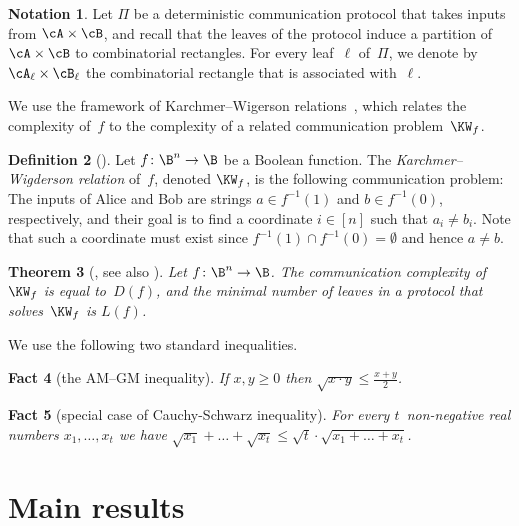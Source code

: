 \documentclass[11pt]{article}
\numberwithin{equation}{section}
\newtheorem{theorem}{Theorem}[section]
\newtheorem{fact}[theorem]{Fact}
\theoremstyle{definition}
\newtheorem{definition}[theorem]{Definition}
\theoremstyle{plain}
\theoremstyle{definition}\newtheorem{notation}[theorem]{Notation}\theoremstyle{plain}
\begin{document}
\begin{notation}
\label{notation:partition-to-rectangles}Let $\Pi$ be a deterministic communication
protocol that takes inputs from $\cA\times\cB$, and recall that the
leaves of the protocol induce a partition of $\cA\times\cB$ to combinatorial
rectangles. For every leaf~$\ell$ of~$\Pi$, we denote by $\cA_{\ell}\times\cB_{\ell}$
the combinatorial rectangle that is associated with~$\ell$. 
\end{notation}

We use the framework of Karchmer--Wigerson relations~\cite{KW90},
which relates the complexity of~$f$ to the complexity of a related
communication problem~$\KW_{f}$. 
\begin{definition}[\cite{KW90}]
Let $f\colon\B^{n}\to\B$ be a Boolean function. The \emph{Karchmer--Wigderson
relation} of~$f$, denoted $\KW_{f}$, is the following communication
problem: The inputs of Alice and Bob are strings $a\in f^{-1}(1)$
and $b\in f^{-1}(0)$, respectively, and their goal is to find a coordinate
$i\in\left[n\right]$ such that $a_{i}\ne b_{i}$. Note that such
a coordinate must exist since $f^{-1}(1)\cap f^{-1}(0)=\emptyset$
and hence $a\ne b$. 
\end{definition}

\begin{theorem}[\cite{KW90}, see also \cite{R90}]
\label{thm:KW-connection}Let $f\colon\B^{n}\to\B$. The communication
complexity of~$\KW_{f}$ is equal to~$D(f)$, and the minimal number
of leaves in a protocol that solves~$\KW_{f}$ is $L(f)$. 
\end{theorem}

%
We use the following two standard inequalities.
\begin{fact}[the AM--GM inequality]
%
%
%
%
%
If $x,y\ge 0$ then $\sqrt{x\cdot y}\le\frac{x+y}{2}$.
\end{fact}

\begin{fact}[special case of Cauchy-Schwarz inequality]
\label{fact:special-cauchy-schwarz} For every $t$~non-negative real
numbers $x_{1},\ldots,x_{t}$ we have $\sqrt{x_{1}}+\ldots+\sqrt{x_{t}}\le\sqrt{t}\cdot\sqrt{x_{1}+\ldots+x_{t}}$.   \qedhere
\end{fact}

%
%
%
%
%

\section{\label{sec:Main-results}Main results}
\end{document}
